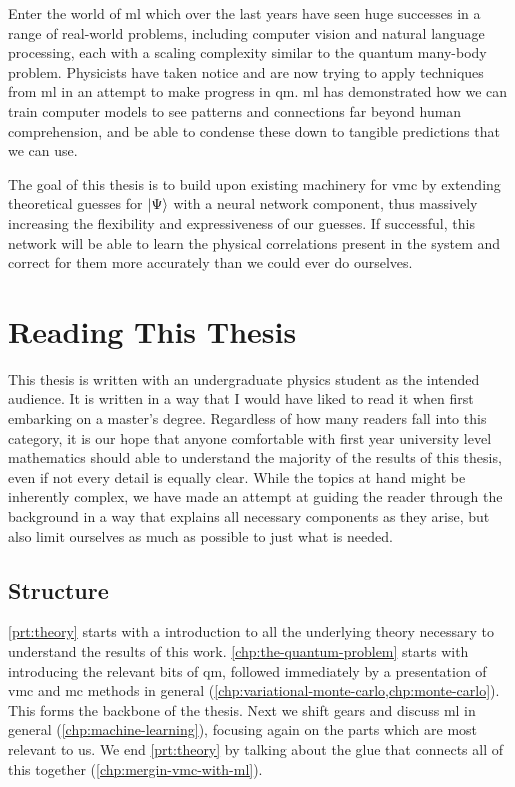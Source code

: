 \documentclass[Thesis.tex]{subfiles}
\begin{document}
Enter the world of \gls{ml} which over the last years have seen
huge successes in a range of real-world problems, including computer vision and
natural language processing, each with a scaling complexity similar to
the quantum many-body problem. Physicists have taken notice and are now trying
to apply techniques from \gls{ml} in an attempt to make progress in \gls{qm}. \Acrlong{ml} has
demonstrated how we can train computer models to see patterns and connections
far beyond human comprehension, and be able to condense these down to tangible
predictions that we can use.

The goal of this thesis is to build upon existing machinery for \gls{vmc} by extending
theoretical guesses for $| \Psi \rangle$ with a neural network component, thus massively
increasing the flexibility and expressiveness of our guesses. If successful, this
network will be able to learn the physical correlations present in the system
and correct for them more accurately than we could ever do ourselves.



\section*{Reading This Thesis}

This thesis is written with an undergraduate physics student as the intended
audience. It is written in a way that I would have liked to read it when first
embarking on a master's degree. Regardless of how many readers fall into this
category, it is our hope that anyone comfortable with first year university
level mathematics should able to understand the majority of the results of this
thesis, even if not every detail is equally clear. While the topics at hand might be
inherently complex, we have made an attempt at guiding the reader through the
background in a way that explains all necessary components as they arise, but
also limit ourselves as much as possible to just what is needed.


\subsection*{Structure}
\cref{prt:theory} starts with a introduction to all the underlying theory
necessary to understand the results of this work. \cref{chp:the-quantum-problem}
starts with introducing the relevant bits of \acrlong{qm}, followed
immediately by a presentation of \acrlong{vmc} and \acrlong{mc} methods
in general (\cref{chp:variational-monte-carlo,chp:monte-carlo}). This forms the
backbone of the thesis. Next we shift gears and discuss \acrlong{ml} in
general (\cref{chp:machine-learning}), focusing again on the parts which are
most relevant to us. We end \cref{prt:theory} by talking about the glue that
connects all of this together (\cref{chp:mergin-vmc-with-ml}).
\end{document}
